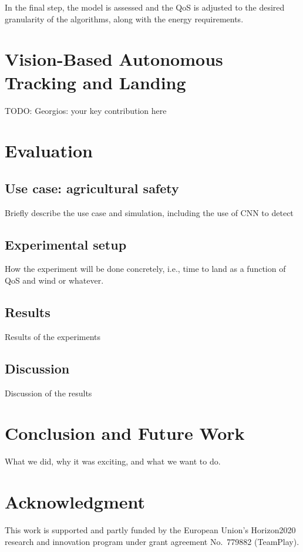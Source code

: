 \documentclass[conference]{IEEEtran}
\begin{document}
In the final step, the model is assessed and the QoS is adjusted to the desired granularity of the algorithms, along with the energy requirements.

\section{Vision-Based Autonomous Tracking and Landing}
\label{sec:landing}

TODO: Georgios: your key contribution here

\section{Evaluation}
\label{sec:experimental}

\subsection{Use case: agricultural safety}

Briefly describe the use case and simulation, including the use of CNN
to detect

\subsection{Experimental setup}

How the experiment will be done concretely, i.e., time to land as a
function of QoS and wind or whatever.

\subsection{Results}

Results of the experiments

\subsection{Discussion}

Discussion of the results

\section{Conclusion and Future Work}
\label{sec:conclusion}

What we did, why it was exciting, and what we want to do.

\section*{Acknowledgment}

This work is supported and partly funded by the European Union’s Horizon2020 research and innovation program under grant agreement No.~779882 (TeamPlay).


 
\vspace{1ex}
\end{document}
